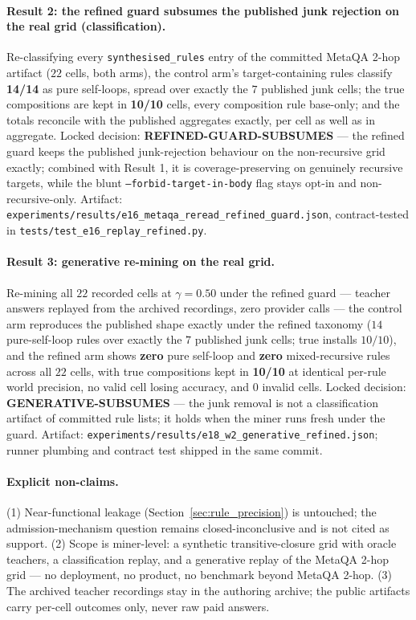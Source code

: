 \paragraph{Result 2: the refined guard subsumes the published junk rejection on the real grid (classification).}
Re-classifying every \texttt{synthesised\_rules} entry of the committed
MetaQA 2-hop artifact ($22$ cells, both arms), the control arm's
target-containing rules classify \textbf{14/14} as pure self-loops, spread
over exactly the $7$ published junk cells; the true compositions are kept
in \textbf{10/10} cells, every composition rule base-only; and the totals
reconcile with the published aggregates exactly, per cell as well as in
aggregate. Locked decision: \textbf{REFINED-GUARD-SUBSUMES} --- the
refined guard keeps the published junk-rejection behaviour on the
non-recursive grid exactly; combined with Result 1, it is
coverage-preserving on genuinely recursive targets, while the blunt
\texttt{--forbid-target-in-body} flag stays opt-in and non-recursive-only.
Artifact: \texttt{experiments/results/e16\_metaqa\_reread\_refined\_guard.json},
contract-tested in \texttt{tests/test\_e16\_replay\_refined.py}.

\paragraph{Result 3: generative re-mining on the real grid.}
Re-mining all $22$ recorded cells at $\gamma{=}0.50$ under the refined
guard --- teacher answers replayed from the archived recordings, zero
provider calls --- the control arm reproduces the published shape exactly
under the refined taxonomy ($14$ pure-self-loop rules over exactly the $7$
published junk cells; true installs $10/10$), and the refined arm shows
\textbf{zero} pure self-loop and \textbf{zero} mixed-recursive rules across
all $22$ cells, with true compositions kept in \textbf{10/10} at identical
per-rule world precision, no valid cell losing accuracy, and $0$ invalid
cells. Locked decision: \textbf{GENERATIVE-SUBSUMES} --- the junk removal
is not a classification artifact of committed rule lists; it holds when
the miner runs fresh under the guard. Artifact:
\texttt{experiments/results/e18\_w2\_generative\_refined.json}; runner
plumbing and contract test shipped in the same commit.

\paragraph{Explicit non-claims.}
(1) Near-functional leakage (Section~\ref{sec:rule_precision}) is
untouched; the admission-mechanism question remains closed-inconclusive
and is not cited as support. (2) Scope is miner-level: a synthetic
transitive-closure grid with oracle teachers, a classification replay, and
a generative replay of the MetaQA 2-hop grid --- no deployment, no
product, no benchmark beyond MetaQA 2-hop. (3) The archived teacher
recordings stay in the authoring archive; the public artifacts carry
per-cell outcomes only, never raw paid answers.


